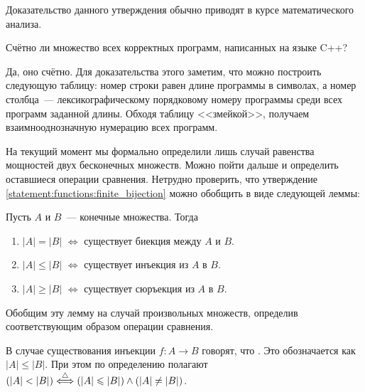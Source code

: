 Доказательство данного утверждения обычно приводят в курсе математического анализа.

\begin{Exercise}[counter=SecExercise]
    \noindent
    Счётно ли множество всех корректных программ, написанных на языке C++?
\end{Exercise}

\begin{Answer}
    \noindent
    Да, оно счётно.
    Для доказательства этого заметим, что можно построить следующую таблицу:
    номер строки равен длине программы в символах, а номер столбца~--- лексикографическому порядковому номеру программы среди всех программ заданной длины.
    Обходя таблицу <<змейкой>>, получаем взаимнооднозначную нумерацию всех программ.
\end{Answer}

На текущий момент мы формально определили лишь случай равенства мощностей двух бесконечных множеств.
Можно пойти дальше и определить оставшиеся операции сравнения.
Нетрудно проверить, что утверждение \ref{statement:functions:finite_bijection} можно обобщить в виде следующей леммы:

\begin{lemma}
    \label{lemma:functions:finite_cardinality_compare}
    Пусть $ A $ и $ B $~--- конечные множества.
    Тогда
    \begin{enumerate}
        \item $ |A| = |B| $ $ \Longleftrightarrow $ существует биекция между $ A $ и $ B $.
        \item $ |A| \leqslant |B| $ $ \Longleftrightarrow $ существует инъекция из $ A $ в $ B $.
        \item $ |A| \geqslant |B| $ $ \Longleftrightarrow $ существует сюръекция из $ A $ в $ B $.
    \end{enumerate}
\end{lemma}

Обобщим эту лемму на случай произвольных множеств, определив соответствующим образом операции сравнения.

\begin{definition}
    \label{definition:functions:cardinaluty_compare}
    В случае существования инъекции $ f: A \to B $ говорят, что .
    Это обозначается как $ |A| \leqslant |B| $.
    При этом по определению полагают $ (|A| < |B|) \overset{\triangle}{\Longleftrightarrow} (|A| \leqslant |B|) \wedge (|A| \neq |B|) $.
\end{definition}

